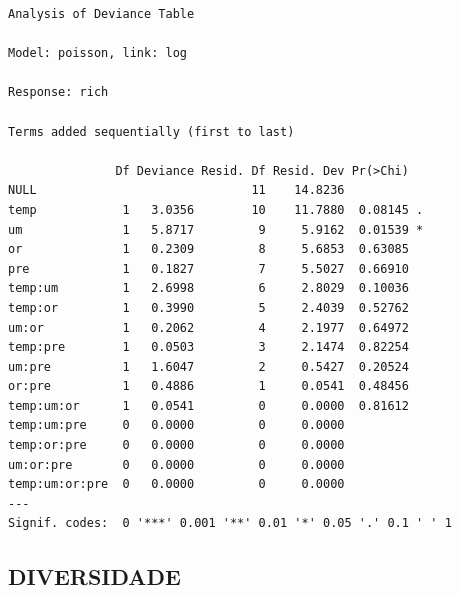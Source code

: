 \documentclass[
  letterpaper,
  DIV=11,
  numbers=noendperiod]{scrartcl}
\begin{document}
\begin{verbatim}
Analysis of Deviance Table

Model: poisson, link: log

Response: rich

Terms added sequentially (first to last)

               Df Deviance Resid. Df Resid. Dev Pr(>Chi)  
NULL                              11    14.8236           
temp            1   3.0356        10    11.7880  0.08145 .
um              1   5.8717         9     5.9162  0.01539 *
or              1   0.2309         8     5.6853  0.63085  
pre             1   0.1827         7     5.5027  0.66910  
temp:um         1   2.6998         6     2.8029  0.10036  
temp:or         1   0.3990         5     2.4039  0.52762  
um:or           1   0.2062         4     2.1977  0.64972  
temp:pre        1   0.0503         3     2.1474  0.82254  
um:pre          1   1.6047         2     0.5427  0.20524  
or:pre          1   0.4886         1     0.0541  0.48456  
temp:um:or      1   0.0541         0     0.0000  0.81612  
temp:um:pre     0   0.0000         0     0.0000           
temp:or:pre     0   0.0000         0     0.0000           
um:or:pre       0   0.0000         0     0.0000           
temp:um:or:pre  0   0.0000         0     0.0000           
---
Signif. codes:  0 '***' 0.001 '**' 0.01 '*' 0.05 '.' 0.1 ' ' 1
\end{verbatim}

\hypertarget{diversidade}{%
\subsection{DIVERSIDADE}\label{diversidade}}
\end{document}
